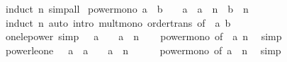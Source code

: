 \begin{isabellebody}
%
\isatagproof
{}\isamarkupfalse%
\ {\isacharparenleft}{\kern0pt}induct\ n{\isacharparenright}{\kern0pt}\ simp{\isacharunderscore}{\kern0pt}all%
\endisatagproof
{\isafoldproof}%
%
\isadelimproof
\isanewline
%
\endisadelimproof
\isanewline
{}\isamarkupfalse%
\ power{\isacharunderscore}{\kern0pt}mono{\isacharcolon}{\kern0pt}\ {\isachardoublequoteopen}a\ {\isasymle}\ b\ {\isasymLongrightarrow}\ {}\ {\isasymle}\ a\ {\isasymLongrightarrow}\ a\ {\isacharcircum}{\kern0pt}\ n\ {\isasymle}\ b\ {\isacharcircum}{\kern0pt}\ n{\isachardoublequoteclose}\isanewline
%
\isadelimproof
\ \ %
\endisadelimproof
%
\isatagproof
{}\isamarkupfalse%
\ {\isacharparenleft}{\kern0pt}induct\ n{\isacharparenright}{\kern0pt}\ {\isacharparenleft}{\kern0pt}auto\ intro{\isacharcolon}{\kern0pt}\ mult{\isacharunderscore}{\kern0pt}mono\ order{\isacharunderscore}{\kern0pt}trans\ {\isacharbrackleft}{\kern0pt}of\ {}\ a\ b{\isacharbrackright}{\kern0pt}{\isacharparenright}{\kern0pt}%
\endisatagproof
{\isafoldproof}%
%
\isadelimproof
\isanewline
%
\endisadelimproof
\isanewline
{}\isamarkupfalse%
\ one{\isacharunderscore}{\kern0pt}le{\isacharunderscore}{\kern0pt}power\ {\isacharbrackleft}{\kern0pt}simp{\isacharbrackright}{\kern0pt}{\isacharcolon}{\kern0pt}\ {\isachardoublequoteopen}{}\ {\isasymle}\ a\ {\isasymLongrightarrow}\ {}\ {\isasymle}\ a\ {\isacharcircum}{\kern0pt}\ n{\isachardoublequoteclose}\isanewline
%
\isadelimproof
\ \ %
\endisadelimproof
%
\isatagproof
{}\isamarkupfalse%
\ power{\isacharunderscore}{\kern0pt}mono\ {\isacharbrackleft}{\kern0pt}of\ {}\ a\ n{\isacharbrackright}{\kern0pt}\ \isamarkupfalse%
\ simp%
\endisatagproof
{\isafoldproof}%
%
\isadelimproof
\isanewline
%
\endisadelimproof
\isanewline
{}\isamarkupfalse%
\ power{\isacharunderscore}{\kern0pt}le{\isacharunderscore}{\kern0pt}one{\isacharcolon}{\kern0pt}\ {\isachardoublequoteopen}{}\ {\isasymle}\ a\ {\isasymLongrightarrow}\ a\ {\isasymle}\ {}\ {\isasymLongrightarrow}\ a\ {\isacharcircum}{\kern0pt}\ n\ {\isasymle}\ {}{\isachardoublequoteclose}\isanewline
%
\isadelimproof
\ \ %
\endisadelimproof
%
\isatagproof
{}\isamarkupfalse%
\ power{\isacharunderscore}{\kern0pt}mono\ {\isacharbrackleft}{\kern0pt}of\ a\ {}\ n{\isacharbrackright}{\kern0pt}\ \isamarkupfalse%
\ simp%
\endisatagproof
{\isafoldproof}%
%
\isadelimproof
\isanewline
%
\endisadelimproof
\isanewline
{}\isamarkupfalse%

\end{isabellebody}
